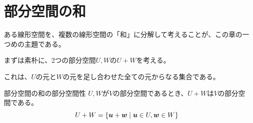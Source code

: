 \documentclass[../../../topic_linear-algebra]{subfiles}
\begin{document}
\sectionline
\section{部分空間の和}

ある線形空間を、複数の線形空間の「和」に分解して考えることが、この章の一つめの主題である。

\br

まずは素朴に、2つの部分空間$U, W$の$U + W$を考える。

これは、$U$の元と$W$の元を足し合わせた全ての元からなる集合である。

\begin{theorem*}{部分空間の和の部分空間性}
  $U,W$が$V$の部分空間であるとき、$U + W$は$V$の部分空間である。
  \begin{equation*}
    U + W = \{ \vb*{u} + \vb*{w} \mid \vb*{u} \in U, \vb*{w} \in W \}
  \end{equation*}
\end{theorem*}
\end{document}
